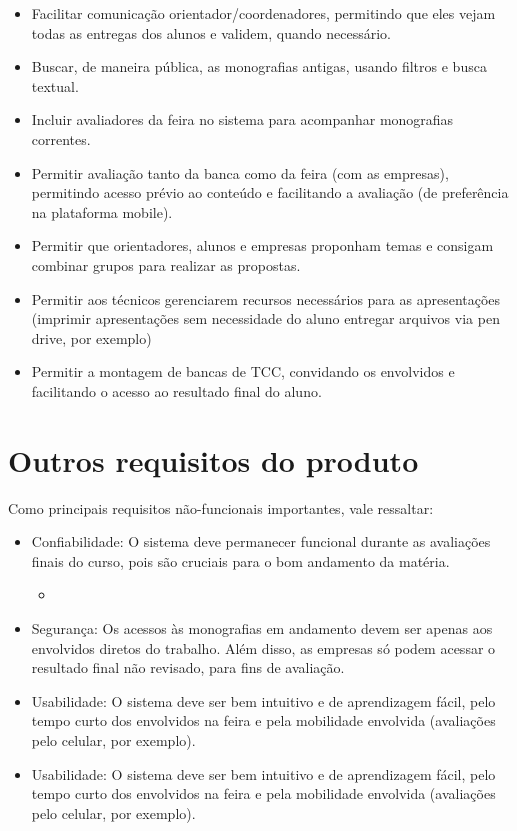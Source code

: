 \begin{itemize}
    \item Facilitar comunicação orientador/coordenadores, permitindo que eles vejam todas as entregas dos alunos e validem, quando necessário.
    \item Buscar, de maneira pública, as monografias antigas, usando filtros e busca textual.
    \item Incluir avaliadores da feira no sistema para acompanhar monografias correntes.
    \item Permitir avaliação tanto da banca como da feira (com as empresas), permitindo acesso prévio ao conteúdo e facilitando a avaliação (de preferência na plataforma mobile).
    \item Permitir que orientadores, alunos e empresas proponham temas e consigam combinar grupos para realizar as propostas.
    \item Permitir aos técnicos gerenciarem recursos necessários para as apresentações (imprimir apresentações sem necessidade do aluno entregar arquivos via pen drive, por exemplo)
    \item Permitir a montagem de bancas de TCC, convidando os envolvidos e facilitando o acesso ao resultado final do aluno.
\end{itemize}
  
\section{Outros requisitos do produto}
Como principais requisitos não-funcionais importantes, vale ressaltar:

\begin{itemize}
    \item Confiabilidade: O sistema deve permanecer funcional durante as avaliações finais do curso, pois são cruciais para o bom andamento da matéria.
    \begin{itemize}
        \item 
    \end{itemize}
    \item Segurança: Os acessos às monografias em andamento devem ser apenas aos envolvidos diretos do trabalho. Além disso, as empresas só podem acessar o resultado final não revisado, para fins de avaliação.
    \item Usabilidade: O sistema deve ser bem intuitivo e de aprendizagem fácil, pelo tempo curto dos envolvidos na feira e pela mobilidade envolvida (avaliações pelo celular, por exemplo).
    \item Usabilidade: O sistema deve ser bem intuitivo e de aprendizagem fácil, pelo tempo curto dos envolvidos na feira e pela mobilidade envolvida (avaliações pelo celular, por exemplo).
\end{itemize}

